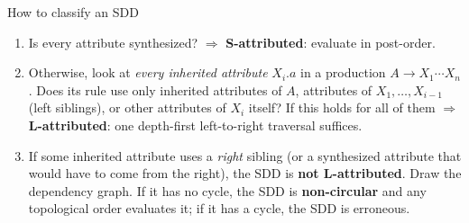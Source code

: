 \documentclass[11pt,a4paper]{article}
\begin{document}
\begin{notebox}{How to classify an SDD}
\begin{enumerate}[nosep]
\item Is every attribute synthesized? $\Rightarrow$ \textbf{S-attributed}: evaluate in post-order.
\item Otherwise, look at \emph{every inherited attribute} $X_i.a$ in a production $A\to X_1\cdots X_n$. Does its rule use only inherited attributes of $A$, attributes of $X_1,\dots,X_{i-1}$ (left siblings), or other attributes of $X_i$ itself? If this holds for all of them $\Rightarrow$ \textbf{L-attributed}: one depth-first left-to-right traversal suffices.
\item If some inherited attribute uses a \emph{right} sibling (or a synthesized attribute that would have to come from the right), the SDD is \textbf{not L-attributed}. Draw the dependency graph. If it has no cycle, the SDD is \textbf{non-circular} and any topological order evaluates it; if it has a cycle, the SDD is erroneous.
\end{enumerate}
\end{notebox}
\end{document}
